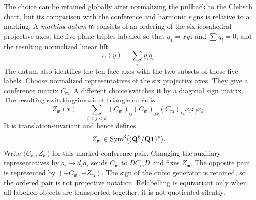 The choice can be retained globally after normalizing the pullback to the
Clebsch chart, but its comparison with the conference and harmonic signs is
relative to a marking.  A \emph{marking datum} \(\mathfrak m\) consists
of an ordering of the six icosahedral projective axes, the five plane triples
labelled so that \(q_1=xyz\) and \(\sum q_i=0\), and the resulting normalized
linear lift
\[
 \iota_t(y)=\sum_i y_iq_i.
\]
The datum also identifies the ten face axes with the two-subsets of those
five labels.  Choose normalized representatives of the six projective axes.
They give a conference matrix
\(C_{\mathfrak m}\).  A different choice switches it by a diagonal sign
matrix.  The resulting switching-invariant triangle cubic is
\[
 Z_{\mathfrak m}(x)=\sum_{i<j<k}(C_{\mathfrak m})_{ij}
 (C_{\mathfrak m})_{jk}(C_{\mathfrak m})_{ki}x_ix_jx_k.
\]
It is translation-invariant and hence defines
\[
 Z_{\mathfrak m}\in\operatorname{Sym}^3
 \bigl((\mathbf Q^6/\mathbf Q\mathbf1)^*\bigr).
\]
Write \(\bigl(C_{\mathfrak m},Z_{\mathfrak m}\bigr)\) for this marked
conference pair.  Changing the auxiliary representatives by \(a_i\mapsto d_i a_i\)
sends \(C_{\mathfrak m}\) to \(DC_{\mathfrak m}D\) and fixes
\(Z_{\mathfrak m}\).  The opposite pair is represented by
\((-C_{\mathfrak m},-Z_{\mathfrak m})\).  The sign of the cubic generator
is retained, so the ordered pair is not projective notation.  Relabelling is
equivariant only when all labelled objects are transported together; it is
not quotiented silently.

